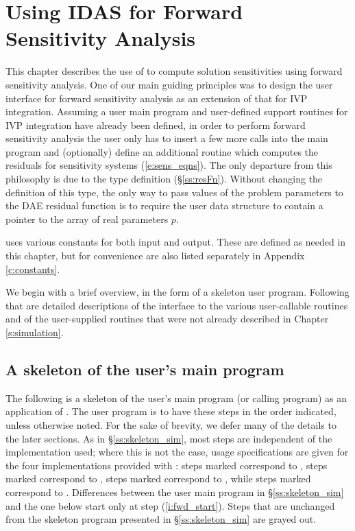 \chapter{Using IDAS for Forward Sensitivity Analysis}\label{s:forward}

This chapter describes the use of {\idas} to compute solution sensitivities using
forward sensitivity analysis. One of our main guiding principles was to design 
the {\idas} user interface for forward sensitivity analysis as an extension of
that for IVP integration. Assuming a user main program and user-defined support 
routines for IVP integration have already been defined, in order to perform 
forward sensitivity analysis the user only has to insert a few more calls 
into the main program and (optionally) define an additional routine which
computes the residuals for sensitivity systems (\ref{e:sens_eqns}). 
The only departure from this philosophy is due to the  type definition
(\S\ref{ss:resFn}). Without changing the definition of this type, the
only way to pass values of the problem parameters to the DAE residual
function is to require the user data structure  to contain a pointer
to the array of real parameters $p$.

{\idas} uses various constants for both input and output.  These are
defined as needed in this chapter, but for convenience are also listed
separately in Appendix \ref{c:constants}.

We begin with a brief overview, in the form of a skeleton user program.
Following that are detailed descriptions of the interface to the
various user-callable routines and of the user-supplied routines that were not already
described in Chapter \ref{s:simulation}.

\section{A skeleton of the user's main program}\label{s:forward_usage}

The following is a skeleton of the user's main program (or calling
program) as an application of {\idas}. The user program is to have these 
steps in the order indicated, unless otherwise noted.
For the sake of brevity, we defer many of the details to the later sections.
As in \S\ref{ss:skeleton_sim}, most steps are independent of the {\nvector}
implementation used; where this is not the case, usage specifications are given for
the four implementations provided with {\idas}:
steps marked {\p} correspond to {\nvecp}, steps marked
{\omp} correspond to {\nvecopenmp}, steps marked {\pt} correspond to
{\nvecpthreads}, while steps marked {\s} correspond to {\nvecs}.
Differences between the user main program in \S\ref{ss:skeleton_sim} and
the one below start only at step (\ref{i:fwd_start}).
Steps that are unchanged from the skeleton program presented in
\S\ref{ss:skeleton_sim} are grayed out.

